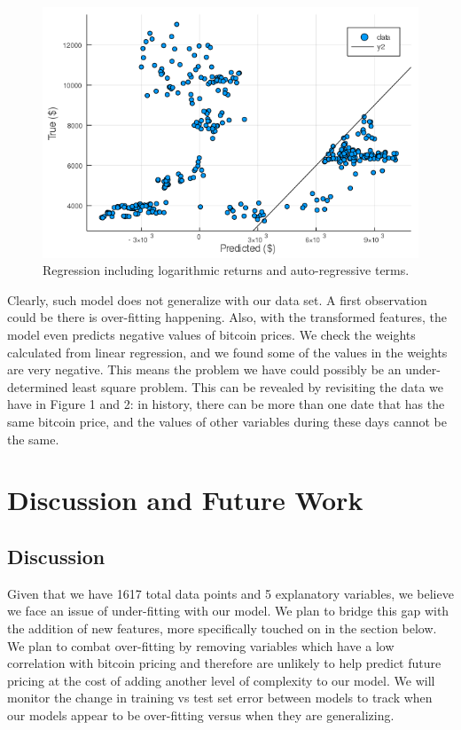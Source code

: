 \documentclass[9pt,twocolumn,twoside]{ilcss}
\begin{document}
\begin{figure}[tbhp]
\centering
\includegraphics[width=1.0\linewidth]{Regression_w_all_explanatory.png}
\caption{Regression including logarithmic returns and auto-regressive terms.}
\label{fig:10}
\end{figure}

Clearly, such model does not generalize with our data set. A first observation could be there is over-fitting happening. Also, with the transformed features, the model even predicts negative values of bitcoin prices. We check the weights calculated from linear regression, and we found some of the values in the weights are very negative. This means the problem we have could possibly be an under-determined least square problem. This can be revealed by revisiting the data we have in Figure 1 and 2: in history, there can be more than one date that has the same bitcoin price, and the values of other variables during these days cannot be the same. 

\section{Discussion and Future Work}
\subsection*{Discussion}
Given that we have 1617 total data points and 5 explanatory variables, we believe we face an issue of under-fitting with our model. We plan to bridge this gap with the addition of new features, more specifically touched on in the section below. We plan to combat over-fitting by removing variables which have a low correlation with bitcoin pricing and therefore are unlikely to help predict future pricing at the cost of adding another level of complexity to our model. We will monitor the change in training vs test set error between models to track when our models appear to be over-fitting versus when they are generalizing.
\end{document}
